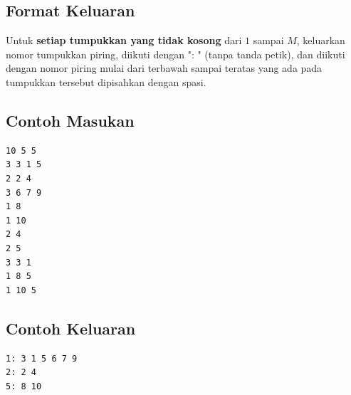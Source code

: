 \documentclass{article}
\begin{document}
\subsection*{Format Keluaran}
Untuk \textbf{setiap tumpukkan yang tidak kosong} dari $1$ sampai $M$, keluarkan nomor tumpukkan piring, diikuti dengan ": " (tanpa tanda petik), dan diikuti dengan nomor piring mulai dari terbawah sampai teratas yang ada pada tumpukkan tersebut dipisahkan dengan spasi.

\begin{multicols}{2}
\subsection*{Contoh Masukan}
\begin{lstlisting}
10 5 5
3 3 1 5
2 2 4
3 6 7 9
1 8
1 10
2 4
2 5
3 3 1
1 8 5
1 10 5

\end{lstlisting}
\columnbreak
\subsection*{Contoh Keluaran}
\begin{lstlisting}
1: 3 1 5 6 7 9
2: 2 4
5: 8 10
\end{lstlisting}
\vfill
\null
\end{multicols}
\end{document}

